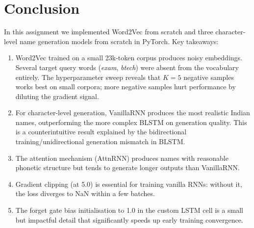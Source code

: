\documentclass[11pt, a4paper]{article}
\begin{document}
\section{Conclusion}

In this assignment we implemented Word2Vec from scratch and three character-level name generation models from scratch in PyTorch. Key takeaways:

\begin{enumerate}
    \item Word2Vec trained on a small 23k-token corpus produces noisy embeddings. Several target query words (\textit{exam}, \textit{btech}) were absent from the vocabulary entirely. The hyperparameter sweep reveals that $K=5$ negative samples works best on small corpora; more negative samples hurt performance by diluting the gradient signal.
    \item For character-level generation, VanillaRNN produces the most realistic Indian names, outperforming the more complex BLSTM on generation quality. This is a counterintuitive result explained by the bidirectional training/unidirectional generation mismatch in BLSTM.
    \item The attention mechanism (AttnRNN) produces names with reasonable phonetic structure but tends to generate longer outputs than VanillaRNN.
    \item Gradient clipping (at 5.0) is essential for training vanilla RNNs: without it, the loss diverges to NaN within a few batches.
    \item The forget gate bias initialisation to 1.0 in the custom LSTM cell is a small but impactful detail that significantly speeds up early training convergence.
\end{enumerate}



\end{document}
